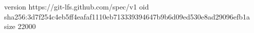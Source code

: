 version https://git-lfs.github.com/spec/v1
oid sha256:3d7f254c4eb5ff4eafaf1110eb713339394647b9b6d09ed530e8ad29096efb1a
size 22000
